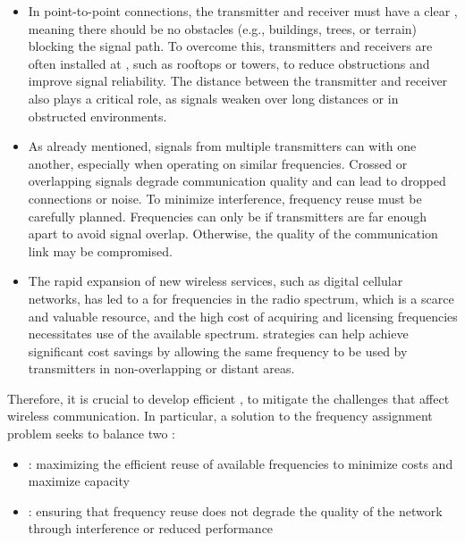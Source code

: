 \documentclass[a4paper, 12pt]{report}
\begin{document}
    \begin{itemize}
        \item In point-to-point connections, the transmitter and receiver must have a clear , meaning there should be no obstacles (e.g., buildings, trees, or terrain) blocking the signal path. To overcome this, transmitters and receivers are often installed at , such as rooftops or towers, to reduce obstructions and improve signal reliability. The distance between the transmitter and receiver also plays a critical role, as signals weaken over long distances or in obstructed environments.
        \item As already mentioned, signals from multiple transmitters can  with one another, especially when operating on similar frequencies. Crossed or overlapping signals degrade communication quality and can lead to dropped connections or noise. To minimize interference, frequency reuse must be carefully planned. Frequencies can only be  if transmitters are far enough apart to avoid signal overlap. Otherwise, the quality of the communication link may be compromised.
        \item The rapid expansion of new wireless services, such as digital cellular networks, has led to a  for frequencies in the radio spectrum, which is a scarce and valuable resource, and the high cost of acquiring and licensing frequencies necessitates  use of the available spectrum.  strategies can help achieve significant cost savings by allowing the same frequency to be used by transmitters in non-overlapping or distant areas.
    \end{itemize}

    Therefore, it is crucial to develop efficient , to mitigate the challenges that affect wireless communication. In particular, a solution to the frequency assignment problem seeks to balance two :

    \begin{itemize}
        \item {}: maximizing the efficient reuse of available frequencies to minimize costs and maximize capacity
        \item {}: ensuring that frequency reuse does not degrade the quality of the network through interference or reduced performance
    \end{itemize}
\end{document}

